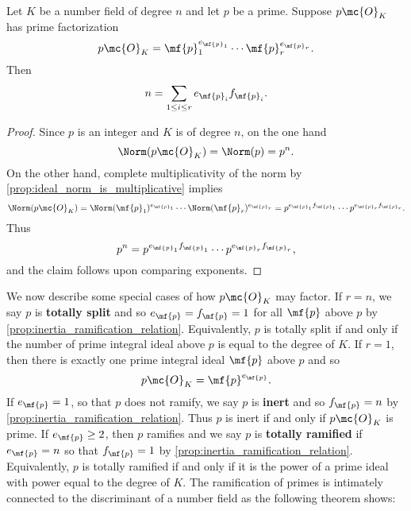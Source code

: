     \begin{proposition}\label{prop:inertia_ramification_relation}
      Let $K$ be a number field of degree $n$ and let $p$ be a prime. Suppose $p\mc{O}_{K}$ has prime factorization
      \[
        p\mc{O}_{K} = \mf{p}_{1}^{e_{\mf{p}_{1}}} \cdots \mf{p}_{r}^{e_{\mf{p}_{r}}}.
      \]
      Then
      \[
        n = \sum_{1 \le i \le r}e_{\mf{p}_{i}}f_{\mf{p}_{i}}.
      \]
    \end{proposition}
    \begin{proof}
      Since $p$ is an integer and $K$ is of degree $n$, on the one hand
      \[
        \Norm(p\mc{O}_{K}) = \Norm(p) = p^{n}.
      \]
      On the other hand, complete multiplicativity of the norm by \cref{prop:ideal_norm_is_multiplicative} implies
      \[
        \Norm(p\mc{O}_{K}) = \Norm(\mf{p}_{1})^{e_{\mf{p}_{1}}} \cdots \Norm(\mf{p}_{r})^{e_{\mf{p}_{r}}} = p^{e_{\mf{p}_{1}}f_{\mf{p}_{1}}} \cdots p^{e_{\mf{p}_{r}}f_{\mf{p}_{r}}}.
      \]
      Thus
      \[
        p^{n} = p^{e_{\mf{p}_{1}}f_{\mf{p}_{1}}} \cdots p^{e_{\mf{p}_{r}}f_{\mf{p}_{r}}},
      \]
      and the claim follows upon comparing exponents.
    \end{proof}

    We now describe some special cases of how $p\mc{O}_{K}$ may factor. If $r = n$, we say $p$ is \textbf{totally split} and so $e_{\mf{p}} = f_{\mf{p}} = 1$ for all $\mf{p}$ above $p$ by \cref{prop:inertia_ramification_relation}. Equivalently, $p$ is totally split if and only if the number of prime integral ideal above $p$ is equal to the degree of $K$. If $r = 1$, then there is exactly one prime integral ideal $\mf{p}$ above $p$ and so
    \[
      p\mc{O}_{K} = \mf{p}^{e_{\mf{p}}}.
    \]
    If $e_{\mf{p}} = 1$, so that $p$ does not ramify, we say $p$ is \textbf{inert} and so $f_{\mf{p}} = n$ by \cref{prop:inertia_ramification_relation}. Thus $p$ is inert if and only if $p\mc{O}_{K}$ is prime. If $e_{\mf{p}} \ge 2$, then $p$ ramifies and we say $p$ is \textbf{totally ramified} if $e_{\mf{p}} = n$ so that $f_{\mf{p}} = 1$ by \cref{prop:inertia_ramification_relation}. Equivalently, $p$ is totally ramified if and only if it is the power of a prime ideal with power equal to the degree of $K$. The ramification of primes is intimately connected to the discriminant of a number field as the following theorem shows:

